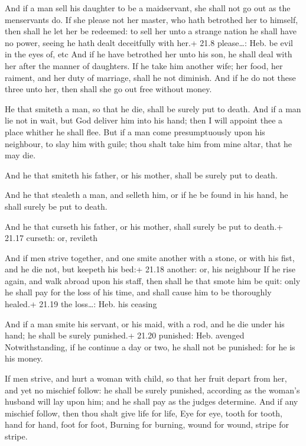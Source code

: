  And if a man sell his daughter to be a maidservant, she
shall not go out as the menservants do.  If she please not
her master, who hath betrothed her to himself, then shall he let her be
redeemed: to sell her unto a strange nation he shall have no power,
seeing he hath dealt deceitfully with her.+ 21.8 please\ldots: Heb. be
evil in the eyes of, etc  And if he have betrothed her unto
his son, he shall deal with her after the manner of daughters.
 If he take him another wife; her food, her raiment, and
her duty of marriage, shall he not diminish.  And if he do
not these three unto her, then shall she go out free without money.

 He that smiteth a man, so that he die, shall be surely
put to death.  And if a man lie not in wait, but God
deliver him into his hand; then I will appoint thee a place whither he
shall flee.  But if a man come presumptuously upon his
neighbour, to slay him with guile; thou shalt take him from mine altar,
that he may die.

 And he that smiteth his father, or his mother, shall be
surely put to death.

 And he that stealeth a man, and selleth him, or if he be
found in his hand, he shall surely be put to death.

 And he that curseth his father, or his mother, shall
surely be put to death.+ 21.17 curseth: or, revileth

 And if men strive together, and one smite another with a
stone, or with his fist, and he die not, but keepeth his bed:+ 21.18
another: or, his neighbour  If he rise again, and walk
abroad upon his staff, then shall he that smote him be quit: only he
shall pay for the loss of his time, and shall cause him to be thoroughly
healed.+ 21.19 the loss\ldots: Heb. his ceasing

 And if a man smite his servant, or his maid, with a rod,
and he die under his hand; he shall be surely punished.+ 21.20 punished:
Heb. avenged  Notwithstanding, if he continue a day or two,
he shall not be punished: for he is his money.

 If men strive, and hurt a woman with child, so that her
fruit depart from her, and yet no mischief follow: he shall be surely
punished, according as the woman's husband will lay upon him; and he
shall pay as the judges determine.  And if any mischief
follow, then thou shalt give life for life,  Eye for eye,
tooth for tooth, hand for hand, foot for foot,  Burning for
burning, wound for wound, stripe for stripe.

